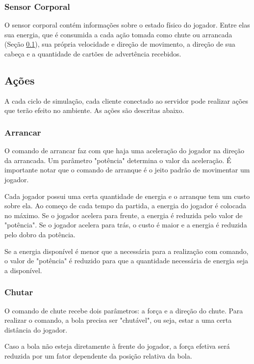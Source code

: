 \subsubsection{Sensor Corporal}

O sensor corporal contém informações sobre o estado físico do jogador. Entre elas sua energia, que é consumida a cada ação tomada como chute ou arrancada (Seção \ref{sec:actions}), sua própria velocidade e direção de movimento, a direção de sua cabeça e a quantidade de cartões de advertência recebidos.

\subsection{Ações}
\label{sec:actions}

A cada ciclo de simulação, cada cliente conectado ao servidor pode realizar ações que terão efeito no ambiente. As ações são descritas abaixo. \cite{rcssmanual2003}

\subsubsection{Arrancar}
\label{sec:dash}

O comando de arrancar faz com que haja uma aceleração do jogador na direção da arrancada. Um parâmetro "potência" determina o valor da aceleração. É importante notar que o comando de arranque é o jeito padrão de movimentar um jogador.

Cada jogador possui uma certa quantidade de energia e o arranque tem um custo sobre ela. Ao começo de cada tempo da partida, a energia do jogador é colocada no máximo. Se o jogador acelera para frente, a energia é reduzida pelo valor de "potência". Se o jogador acelera para trás, o custo é maior e a energia é reduzida pelo dobro da potência.

Se a energia disponível é menor que a necessária para a realização com comando, o valor de "potência" é reduzido para que a quantidade necessária de energia seja a disponível.

\subsubsection{Chutar}

O comando de chute recebe dois parâmetros: a força e a direção do chute. Para realizar o comando, a bola precisa ser "chutável", ou seja, estar a uma certa distância do jogador.

Caso a bola não esteja diretamente à frente do jogador, a força efetiva será reduzida por um fator dependente da posição relativa da bola.

